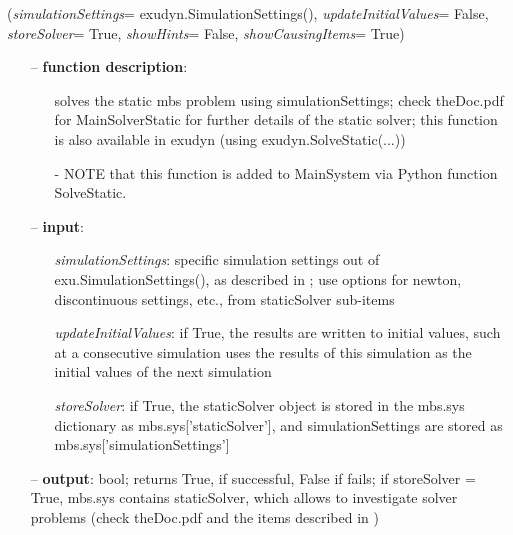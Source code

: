 %
\begin{flushleft}
\label{sec:mainsystemextensions:SolveStatic}
({\it simulationSettings}= exudyn.SimulationSettings(), {\it updateInitialValues}= False, {\it storeSolver}= True, {\it showHints}= False, {\it showCausingItems}= True)
\end{flushleft}
\setlength{\itemindent}{0.7cm}
\begin{itemize}[leftmargin=0.7cm]
\item[--]
{\bf function description}: \vspace{-6pt}
\begin{itemize}[leftmargin=1.2cm]
\setlength{\itemindent}{-0.7cm}
\item[]solves the static mbs problem using simulationSettings; check theDoc.pdf for MainSolverStatic for further details of the static solver; this function is also available in exudyn (using exudyn.SolveStatic(...))
\item[]- NOTE that this function is added to MainSystem via Python function SolveStatic.
\end{itemize}
\item[--]
{\bf input}: \vspace{-6pt}
\begin{itemize}[leftmargin=1.2cm]
\setlength{\itemindent}{-0.7cm}
\item[]{\it simulationSettings}: specific simulation settings out of exu.SimulationSettings(), as described in ; use options for newton, discontinuous settings, etc., from staticSolver sub-items
\item[]{\it updateInitialValues}: if True, the results are written to initial values, such at a consecutive simulation uses the results of this simulation as the initial values of the next simulation
\item[]{\it storeSolver}: if True, the staticSolver object is stored in the mbs.sys dictionary as mbs.sys['staticSolver'], and simulationSettings are stored as mbs.sys['simulationSettings']
\end{itemize}
\item[--]
{\bf output}: bool; returns True, if successful, False if fails; if storeSolver = True, mbs.sys contains staticSolver, which allows to investigate solver problems (check theDoc.pdf  and the items described in )
\vspace{12pt}\end{itemize}
%

